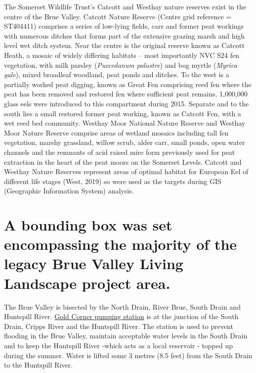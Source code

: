 \documentclass[]{article}
\begin{document}
The Somerset Wildlife Trust's Catcott and Westhay nature reserves exist
in the centre of the Brue Valley. Catcott Nature Reserve (Centre grid
reference = ST404411) comprises a series of low-lying fields, carr and
former peat workings with numerous ditches that forms part of the
extensive grazing marsh and high level wet ditch system. Near the centre
is the original reserve known as Catcott Heath, a mosaic of widely
differing habitats -- most importantly NVC S24 fen vegetation, with milk
parsley (\emph{Puecedanum palustre}) and bog myrtle (\emph{Myrica
gale}), mixed broadleaf woodland, peat ponds and ditches. To the west is
a partially worked peat digging, known as Great Fen comprising reed fen
where the peat has been removed and restored fen where sufficient peat
remains. 1,000,000 glass eels were introduced to this compartment during
2015. Separate and to the south lies a small restored former peat
working, known as Catcott Fen, with a wet reed bed community. Westhay
Moor National Nature Reserve and Westhay Moor Nature Reserve comprise
areas of wetland mosaics including tall fen vegetation, marshy
grassland, willow scrub, alder carr, small ponds, open water channels
and the remnants of acid raised mire form previously used for peat
extraction in the heart of the peat moors on the Somerset Levels.
Catcott and Westhay Nature Reserves represent areas of optimal habitat
for European Eel of different life stages (West, 2019) so were used as
the targets during GIS (Geographic Information System) analysis.

\hypertarget{a-bounding-box-was-set-encompassing-the-majority-of-the-legacy-brue-valley-living-landscape-project-area.}{%
\section{A bounding box was set encompassing the majority of the legacy
Brue Valley Living Landscape project
area.}\label{a-bounding-box-was-set-encompassing-the-majority-of-the-legacy-brue-valley-living-landscape-project-area.}}

The Brue Valley is bisected by the North Drain, River Brue, South Drain
and Huntspill River.
\href{http://ea-lit.freshwaterlife.org/archive/ealit:950}{Gold Corner
pumping station} is at the junction of the South Drain, Cripps River and
the Huntspill River. The station is used to prevent flooding in the Brue
Valley, maintain acceptable water levels in the South Drain and to keep
the Huntspill River -which acts as a local reservoir - topped up during
the summer. Water is lifted some 3 metres (8.5 feet) from the South
Drain to the Huntspill River.
\end{document}
